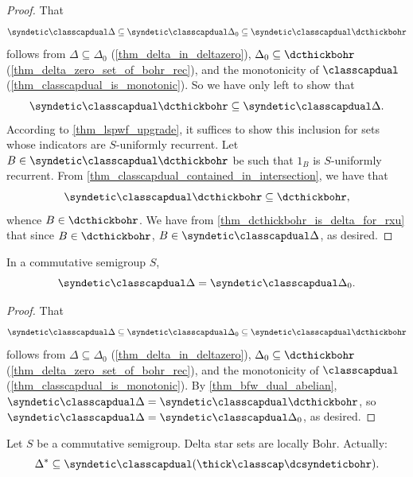\begin{proof}
\leanok{}
    That
    \[\syndetic \classcapdual \Delta \subseteq \syndetic \classcapdual \Delta_0 \subseteq \syndetic \classcapdual \dcthickbohr\]
    follows from $\Delta \subseteq \Delta_0$ (\cref{thm_delta_in_deltazero}), $\Delta_0 \subseteq \dcthickbohr$ (\cref{thm_delta_zero_set_of_bohr_rec}), and the monotonicity of $\classcapdual$ (\cref{thm_classcapdual_is_monotonic}). So we have only left to show that
    \[\syndetic \classcapdual \dcthickbohr \subseteq \syndetic \classcapdual \Delta.\]
    According to \cref{thm_lspwf_upgrade}, it suffices to show this inclusion for sets whose indicators are $S$-uniformly recurrent.  Let $B \in \syndetic \classcapdual \dcthickbohr$ be such that $1_B$ is $S$-uniformly recurrent.  From \cref{thm_classcapdual_contained_in_intersection}, we have that
    \[\syndetic \classcapdual \dcthickbohr \subseteq \dcthickbohr,\]
    whence $B \in \dcthickbohr$.  We have from \cref{thm_dcthickbohr_is_delta_for_rxu} that since $B \in \dcthickbohr$, $B \in \syndetic \classcapdual \Delta$, as desired.
\end{proof}

\begin{theorem}
\label{thm_bfw_dual_abelian_v2}
    In a commutative semigroup $S$,
    \[\syndetic \classcapdual \Delta = \syndetic \classcapdual \Delta_0.\]
\end{theorem}

\begin{proof}
\leanok{}
    That
    \[\syndetic \classcapdual \Delta \subseteq \syndetic \classcapdual \Delta_0 \subseteq \syndetic \classcapdual \dcthickbohr\]
    follows from $\Delta \subseteq \Delta_0$ (\cref{thm_delta_in_deltazero}), $\Delta_0 \subseteq \dcthickbohr$ (\cref{thm_delta_zero_set_of_bohr_rec}), and the monotonicity of $\classcapdual$ (\cref{thm_classcapdual_is_monotonic}).  By \cref{thm_bfw_dual_abelian}, $\syndetic \classcapdual \Delta = \syndetic \classcapdual \dcthickbohr$, so $\syndetic \classcapdual \Delta = \syndetic \classcapdual \Delta_0$, as desired.
\end{proof}

\begin{theorem}
\label{thm_delta_star_locally_bohr}
\leanok{}
    Let $S$ be a commutative semigroup. Delta star sets are locally Bohr.  Actually:
    \[\Delta^* \subseteq \syndetic \classcapdual (\thick \classcap \dcsyndeticbohr).\]
\end{theorem}

